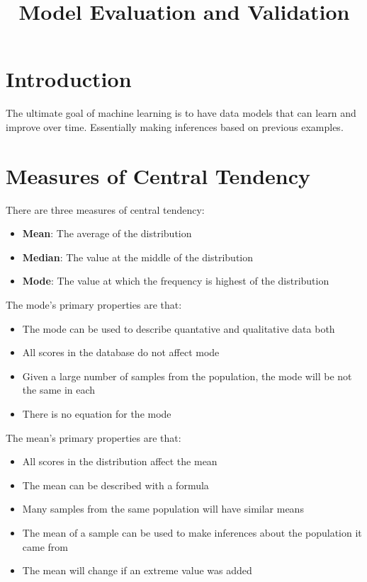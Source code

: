 \documentclass{article}
\title{Model Evaluation and Validation}
\author{}
\date{}
\begin{document}
\nocite{*}
\maketitle
\section{Introduction}
The ultimate goal of machine learning is to have data models that
can learn and improve over time. Essentially making inferences based on
previous examples.

\section{Measures of Central Tendency}

There are three measures of central tendency:
\begin{itemize}
\item \textbf{Mean}: The average of the distribution
\item \textbf{Median}: The value at the middle of the distribution
\item \textbf{Mode}: The value at which the frequency is highest of the distribution
\end{itemize}
The mode's primary properties are that:
\begin{itemize}
\item The mode can be used to describe quantative and qualitative data both
\item All scores in the database do not affect mode
\item Given a large number of samples from the population, the mode will be
not the same in each
\item There is no equation for the mode
\end{itemize}

The mean's primary properties are that:
\begin{itemize}
\item All scores in the distribution affect the mean
\item The mean can be described with a formula
\item Many samples from the same population will have similar means
\item The mean of a sample can be used to make inferences about the
population it came from
\item The mean will change if an extreme value was added
\end{itemize}
\end{document}
